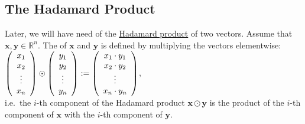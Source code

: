 \subsection{The Hadamard Product}
Later, we will have need of the \href{https://en.wikipedia.org/wiki/Hadamard_product_(matrices)}{Hadamard product} 
of two vectors.  Assume that $\mathbf{x}, \mathbf{y} \in \mathbb{R}^n$.  The  of
$\mathbf{x}$ and $\mathbf{y}$ is defined by multiplying the vectors elementwise:
\\[0.2cm]
\hspace*{1.3cm}
$\left(
  \begin{array}[c]{c}
    x_1 \\
    x_2 \\
    \vdots \\
    x_n
  \end{array}
\right) \odot
\left(
  \begin{array}[c]{c}
    y_1 \\
    y_2 \\
    \vdots \\
    y_n
  \end{array}
\right) := 
\left(
  \begin{array}[c]{c}
    x_1 \cdot y_1 \\
    x_2 \cdot y_2 \\
    \vdots \\
    x_n \cdot y_n
  \end{array}
\right)
$,
\\[0.2cm]
i.e.~the $i$-th component of the Hadamard product $\mathbf{x} \odot \mathbf{y}$ is the product of the $i$-th
component of $\mathbf{x}$ with the $i$-th component of $\mathbf{y}$.

